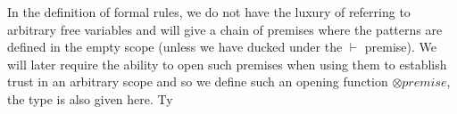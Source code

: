 In the definition of formal rules, we do not have the luxury of referring to arbitrary
free variables and will give a chain of premises where the patterns are defined
in the empty scope (unless we have ducked under the $\vdash$ premise). We will later
require the ability to open such premises when using them to establish trust in
an arbitrary scope and so we define such an opening function $⊗premise$, the type
is also given here.
Ty
\begin{code}%
\>[0]\AgdaSpace{}%
%
\>[11]\AgdaSymbol{(}\AgdaSpace{}%
\AgdaSpace{}%
\AgdaSymbol{:}\AgdaSpace{}%
\AgdaSpace{}%
\AgdaSymbol{)}\AgdaSpace{}%
\AgdaSymbol{(}\AgdaSpace{}%
\AgdaSymbol{:}\AgdaSpace{}%
\AgdaSymbol{)}\AgdaSpace{}%
\AgdaSymbol{:}\<%
\\
%
\>[11]\AgdaSymbol{(}\AgdaSpace{}%
\AgdaSymbol{:}\AgdaSpace{}%
\AgdaSpace{}%
\AgdaSymbol{)}\AgdaSpace{}%
\AgdaSpace{}%
\AgdaSymbol{(}\AgdaSpace{}%
\AgdaSymbol{:}\AgdaSpace{}%
\AgdaSpace{}%
\AgdaSymbol{)}\AgdaSpace{}%
\AgdaSpace{}%
\AgdaSpace{}%
\<%
\\
\>[0][@{}l@{\AgdaIndent{0}}]%
\>[3]%
\>[12]\AgdaSymbol{:}\AgdaSpace{}%
\AgdaSymbol{(}\AgdaSpace{}%
\AgdaSymbol{:}\AgdaSpace{}%
\AgdaSpace{}%
\AgdaSpace{}%
\AgdaSymbol{)}\AgdaSpace{}%
\AgdaSpace{}%
\AgdaSymbol{(}\AgdaSpace{}%
\AgdaSymbol{:}\AgdaSpace{}%
\AgdaSpace{}%
\AgdaSpace{}%
\AgdaSymbol{)}\AgdaSpace{}%
\AgdaSpace{}%
\AgdaSpace{}%
\AgdaSpace{}%
\AgdaSpace{}%
\AgdaSpace{}%
\AgdaSymbol{(}\AgdaSpace{}%
\AgdaSymbol{)}\AgdaSpace{}%
\AgdaSymbol{(}\AgdaSpace{}%
\AgdaOperator{\AgdaFunction{-}}\AgdaSpace{}%
\AgdaSymbol{)}\<%
\\
%
\>[3]%
\>[12]\AgdaSymbol{:}\AgdaSpace{}%
\AgdaSymbol{(}\AgdaSpace{}%
\AgdaSymbol{:}\AgdaSpace{}%
\AgdaSpace{}%
\AgdaSpace{}%
\AgdaSpace{}%
\AgdaSymbol{)}\AgdaSpace{}%

\end{code}
